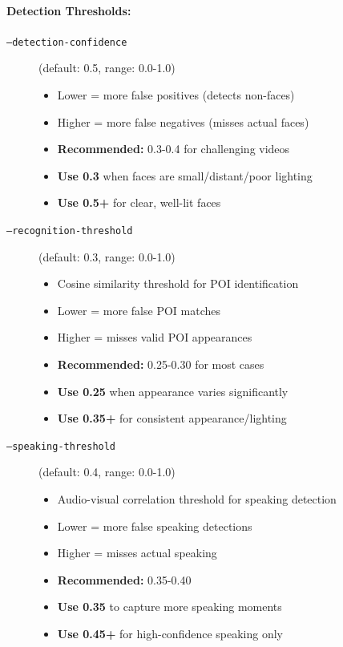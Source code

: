 \documentclass[11pt,a4paper]{article}
\begin{document}
\paragraph{Detection Thresholds:}

\begin{description}
    \item[\texttt{--detection-confidence}] (default: 0.5, range: 0.0-1.0)
    \begin{itemize}
        \item Lower = more false positives (detects non-faces)
        \item Higher = more false negatives (misses actual faces)
        \item \textbf{Recommended:} 0.3-0.4 for challenging videos
        \item \textbf{Use 0.3} when faces are small/distant/poor lighting
        \item \textbf{Use 0.5+} for clear, well-lit faces
    \end{itemize}
    
    \item[\texttt{--recognition-threshold}] (default: 0.3, range: 0.0-1.0)
    \begin{itemize}
        \item Cosine similarity threshold for POI identification
        \item Lower = more false POI matches
        \item Higher = misses valid POI appearances
        \item \textbf{Recommended:} 0.25-0.30 for most cases
        \item \textbf{Use 0.25} when appearance varies significantly
        \item \textbf{Use 0.35+} for consistent appearance/lighting
    \end{itemize}
    
    \item[\texttt{--speaking-threshold}] (default: 0.4, range: 0.0-1.0)
    \begin{itemize}
        \item Audio-visual correlation threshold for speaking detection
        \item Lower = more false speaking detections
        \item Higher = misses actual speaking
        \item \textbf{Recommended:} 0.35-0.40
        \item \textbf{Use 0.35} to capture more speaking moments
        \item \textbf{Use 0.45+} for high-confidence speaking only
    \end{itemize}
\end{description}
\end{document}
